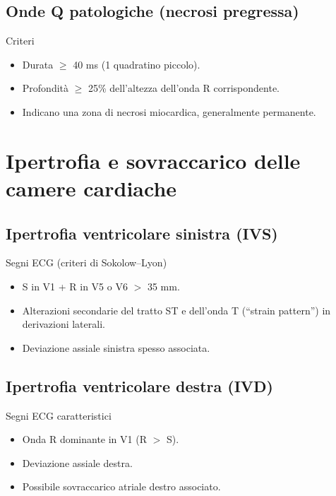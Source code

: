 \documentclass[11pt,a4paper]{article}
\begin{document}
\subsection{Onde Q patologiche (necrosi pregressa)}
\begin{keybox}{Criteri}
\begin{itemize}[leftmargin=1.2em]
  \item Durata $\geq$ 40 ms (1 quadratino piccolo).
  \item Profondità $\geq$ 25\% dell'altezza dell'onda R corrispondente.
  \item Indicano una zona di necrosi miocardica, generalmente permanente.
\end{itemize}
\end{keybox}

\section{Ipertrofia e sovraccarico delle camere cardiache}

\subsection{Ipertrofia ventricolare sinistra (IVS)}
\begin{keybox}{Segni ECG (criteri di Sokolow--Lyon)}
\begin{itemize}[leftmargin=1.2em]
  \item S in V1 + R in V5 o V6 $>$ 35 mm.
  \item Alterazioni secondarie del tratto ST e dell'onda T (“strain pattern”) in derivazioni laterali.
  \item Deviazione assiale sinistra spesso associata.
\end{itemize}
\end{keybox}

\subsection{Ipertrofia ventricolare destra (IVD)}
\begin{keybox}{Segni ECG caratteristici}
\begin{itemize}[leftmargin=1.2em]
  \item Onda R dominante in V1 (R $>$ S).
  \item Deviazione assiale destra.
  \item Possibile sovraccarico atriale destro associato.
\end{itemize}
\end{keybox}
\end{document}
